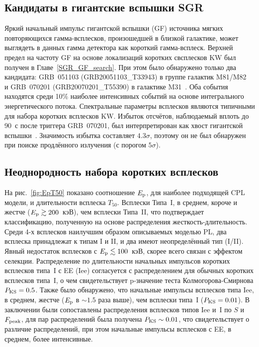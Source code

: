 \subsection{Кандидаты в гигантские вспышки SGR}
Яркий начальный импульс гигантской вспышки (GF) источника мягких повторяющихся гамма-всплесков, 
произошедшей в близкой галактике, может выглядеть в данных гамма детектора как короткий гамма-всплеск. 
Верхней предел на частоту GF на основе локализаций коротких свсплесков KW был
получен в Главе~\ref{SGR_GF_search}. При этом было обнаружено только два кандидата:
GRB~051103 (GRB20051103\_T33943) в группе галактик M81/M82~\citep{Frederiks_2007AstLett} и 
GRB~070201 (GRB20070201\_T55390) в галактике M31~\citep{Mazets_2008ApJ}.
Оба события находятся среди 10\% наиболее интенсивных событий на основе интегрального 
энергетического потока. Спектральные параметры всплесков являются типичными для 
набора коротких всплесков KW.
Избыток отсчётов, наблюдаемый вплоть до 90~с после триггера GRB~070201, 
был интерпретирован как хвост гигантской вспышки~\citep{Mazets_2008ApJ}.
Значимость избытка составляет $4.3\sigma$, поэтому он не был обнаружен при 
поиске продлённого излучения (с порогом $5\sigma$).

\subsection{Неоднородность набора коротких всплесков}
На рис.~\ref{fig:EpT50} показано соотношение $E_{\mathrm{p}}$, для наиболее подходящей CPL модели,
и длительности всплеска $T_{50}$. Всплески Типа~I, в среднем, короче и жестче 
($E_{\mathrm{p}}\gtrsim 200$~кэВ), чем всплески Типа~II, что подтверждает классификацию,
полученную на основе распределения жесткость-длительность.
Среди 4-х всплесков наилучшим образом описываемых моделью PL, два всплеска принадлежат к типам I и II,
и два имеют неопределённый тип (I/II). Явный недостаток всплесков с $E_{\mathrm{p}}\lesssim 100$~кэВ,
скорее всего связан с эффектом селекции. 
Распределение по длительности начальных импульсов коротких всплесков типа~I с EE (Iee) согласуется с 
распределением для обычных коротких всплесков типа~I, о чем свидетельствует p-значение
теста Колмогорова-Смирнова $P_{\mathrm{KS}}=0.5$. Также было обнаружено, что
начальные импульсы всплесков типа Iee, в среднем, жестче ($E_{\mathrm{p}}$ в $\sim 1.5$ раза выше),
чем всплески типа~I ($P_{\mathrm{KS}} = 0.01$). В заключении были сопоставлены распределения 
всплесков типов Iee и~I по $S$ и $F_{\mathrm{peak}}$, для пар распределений 
была получена $P_{\mathrm{KS}} \sim 0.01$, что свидетельствует о различие распределений,
при этом начальные импульсы всплесков с EE, в среднем, более интенсивные.

